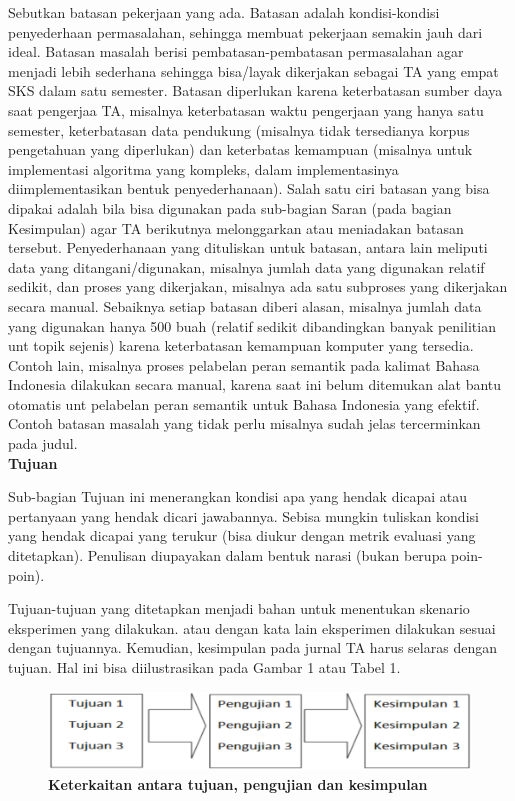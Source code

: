 Sebutkan batasan pekerjaan yang ada. Batasan adalah kondisi-kondisi penyederhaan permasalahan, sehingga membuat pekerjaan semakin jauh dari ideal. Batasan masalah berisi pembatasan-pembatasan permasalahan agar menjadi lebih sederhana sehingga bisa/layak dikerjakan sebagai TA yang empat SKS dalam satu semester. Batasan diperlukan karena keterbatasan sumber daya saat pengerjaa TA, misalnya keterbatasan waktu pengerjaan yang hanya satu semester, keterbatasan data pendukung (misalnya tidak tersedianya korpus pengetahuan yang diperlukan) dan keterbatas kemampuan (misalnya untuk implementasi algoritma yang kompleks, dalam implementasinya diimplementasikan bentuk penyederhanaan). Salah satu ciri batasan yang bisa dipakai adalah bila bisa digunakan pada sub-bagian Saran (pada bagian Kesimpulan) agar TA berikutnya melonggarkan atau meniadakan batasan tersebut. Penyederhanaan yang dituliskan untuk batasan, antara lain meliputi data yang ditangani/digunakan, misalnya  jumlah data yang digunakan relatif sedikit, dan proses yang dikerjakan, misalnya ada satu subproses yang dikerjakan secara manual. Sebaiknya setiap batasan diberi alasan, misalnya jumlah data yang digunakan hanya 500 buah (relatif sedikit dibandingkan banyak penilitian unt topik sejenis) karena keterbatasan kemampuan komputer yang tersedia. Contoh lain, misalnya proses pelabelan peran semantik pada kalimat Bahasa Indonesia dilakukan secara manual, karena saat ini belum ditemukan alat bantu otomatis unt pelabelan peran semantik untuk Bahasa Indonesia yang efektif. Contoh batasan masalah yang tidak perlu misalnya sudah jelas tercerminkan pada judul.
\\


\noindent\textbf{Tujuan}

Sub-bagian Tujuan ini menerangkan kondisi apa yang hendak dicapai atau pertanyaan yang hendak dicari jawabannya. Sebisa mungkin tuliskan kondisi yang hendak dicapai yang terukur (bisa diukur dengan metrik evaluasi yang ditetapkan).  
Penulisan diupayakan dalam bentuk narasi (bukan berupa poin-poin).

Tujuan-tujuan yang ditetapkan menjadi bahan untuk menentukan skenario eksperimen yang dilakukan. atau dengan kata lain eksperimen dilakukan sesuai dengan tujuannya. Kemudian, kesimpulan pada jurnal TA harus selaras dengan tujuan. Hal ini bisa diilustrasikan pada Gambar 1 atau Tabel 1.
\begin{figure}[h!]
\centering
\includegraphics[scale=0.30]{Tujuan.png}
\caption{\textbf{Keterkaitan antara tujuan, pengujian dan kesimpulan}}
\label{fig:tujuan}
\end{figure}

